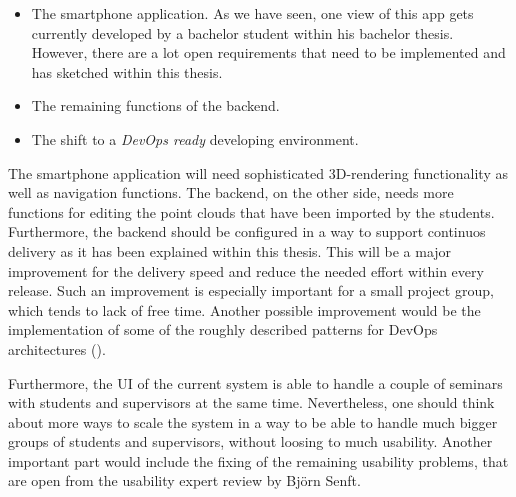 \begin{itemize}
\item The smartphone application. As we have seen, one view of this app gets currently developed by a bachelor student within his bachelor thesis. However, there are a lot open requirements that need to be implemented and has sketched within this thesis.
\item The remaining functions of the backend.
\item The shift to a \emph{DevOps ready} developing environment. 
\end{itemize}

The smartphone application will need sophisticated 3D-rendering functionality as well as navigation functions. The backend, on the other side, needs more functions for editing the point clouds that have been imported by the students. Furthermore, the backend should be configured in a way to support continuos delivery as it has been explained within this thesis. This will be a major improvement for the delivery speed and reduce the needed effort within every release. Such an improvement is especially important for a small project group, which tends to lack of free time. Another possible improvement would be the implementation of some of the roughly described patterns for DevOps architectures (\cite{cukier2013devops}).

Furthermore, the \ac{UI} of the current system is able to handle a couple of seminars with students and supervisors at the same time. Nevertheless, one should think about more ways to scale the system in a way to be able to handle much bigger groups of students and supervisors, without loosing to much usability. Another important part would include the fixing of the remaining usability problems, that are open from the usability expert review by Bj\"orn Senft. 
